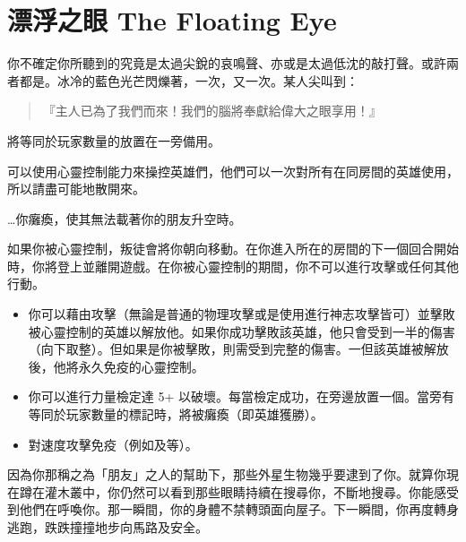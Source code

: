 
\chapter{漂浮之眼 The Floating Eye}

\begin{HauntStory}
  你不確定你所聽到的究竟是太過尖銳的哀鳴聲、亦或是太過低沈的敲打聲。或許兩者都是。冰冷的藍色光芒閃爍著，一次，又一次。某人尖叫到：
  \begin{quote}
    『主人已為了我們而來！我們的腦將奉獻給偉大之眼享用！』
  \end{quote}
\end{HauntStory}

將等同於玩家數量的放置在一旁備用。

可以使用心靈控制能力來操控英雄們，他們可以一次對所有在同房間的英雄使用，所以請盡可能地散開來。

…你癱瘓，使其無法載著你的朋友升空時。

如果你被心靈控制，叛徒會將你朝向移動。在你進入所在的房間的下一個回合開始時，你將登上並離開遊戲。在你被心靈控制的期間，你不可以進行攻擊或任何其他行動。

\vfill\null\pagebreak

\vspace*{-1em}
\begin{itemize}
  \item 你可以藉由攻擊（無論是普通的物理攻擊或是使用進行神志攻擊皆可）並擊敗被心靈控制的英雄以解放他。如果你成功擊敗該英雄，他只會受到一半的傷害（向下取整）。但如果是你被擊敗，則需受到完整的傷害。一但該英雄被解放後，他將永久免疫的心靈控制。
  \item 你可以進行力量檢定達 5+ 以破壞。每當檢定成功，在旁邊放置一個。當旁有等同於玩家數量的標記時，將被癱瘓（即英雄獲勝）。
  \item {}對速度攻擊免疫（例如及等）。
\end{itemize}

\begin{HauntStory}
  因為你那稱之為「朋友」之人的幫助下，那些外星生物幾乎要逮到了你。就算你現在蹲在灌木叢中，你仍然可以看到那些眼睛持續在搜尋你，不斷地搜尋。你能感受到他們在呼喚你。那一瞬間，你的身體不禁轉頭面向屋子。下一瞬間，你再度轉身逃跑，跌跌撞撞地步向馬路及安全。
\end{HauntStory}
